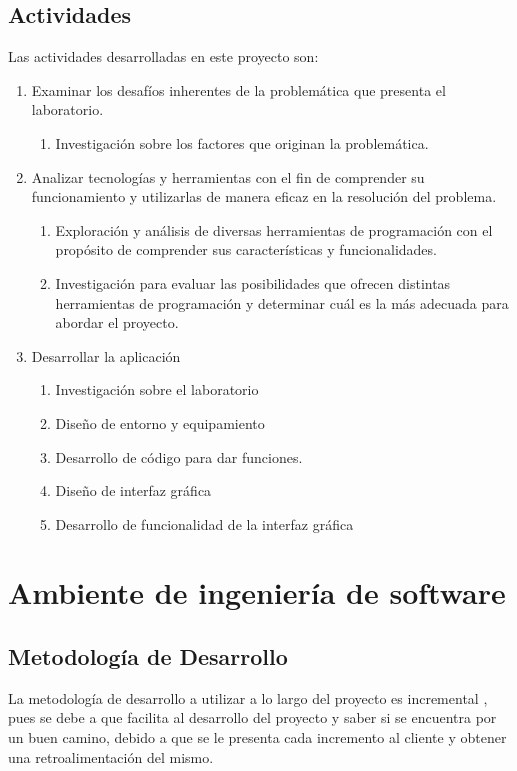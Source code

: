\subsection{Actividades}
Las actividades desarrolladas en este proyecto son:
\begin{enumerate}[label=\roman*.-]
\item Examinar los desafíos inherentes de la problemática que presenta el laboratorio.
    \begin{enumerate}[label=\arabic*.-]
    \item Investigación sobre los factores que originan la problemática.
    \end{enumerate}
\item Analizar tecnologías y herramientas con el fin de comprender su funcionamiento y utilizarlas de manera eficaz en la resolución del problema.
    \begin{enumerate}[label=\arabic*.-]
    \item Exploración y análisis de diversas herramientas de programación con el propósito de comprender sus características y funcionalidades.
    \item Investigación para evaluar las posibilidades que ofrecen distintas herramientas de programación y determinar cuál es la más adecuada para abordar el proyecto.
    \end{enumerate}
\item Desarrollar la aplicación
    \begin{enumerate}[label=\arabic*.-]
    \item Investigación sobre el laboratorio
    \item Diseño de entorno y equipamiento
    \item Desarrollo de código para dar funciones.
    \item Diseño de interfaz gráfica
    \item Desarrollo de funcionalidad de la interfaz gráfica
    \end{enumerate}
\end{enumerate}

\section{Ambiente de ingeniería de software}
\subsection{Metodología de Desarrollo}
La metodología de desarrollo a utilizar a lo largo del proyecto es incremental \cite{Incremental}, pues se debe a que facilita al desarrollo del proyecto y saber si se encuentra por un buen camino, debido a que se le presenta cada incremento al cliente y obtener una retroalimentación del mismo.

